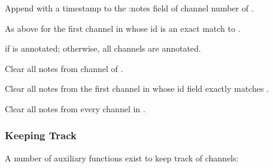 \documentclass[letterpaper,11pt,english]{sphinxmanual}
\begin{document}
\begin{fulllineitems}
\end{fulllineitems}


Append  with a timestamp to the :notes field of channel number  of .


\begin{fulllineitems}
\end{fulllineitems}


As above for the first channel in  whose id is an exact match to .


\begin{fulllineitems}
\end{fulllineitems}


if  is annotated; otherwise, all channels are annotated.

Clear all notes from channel  of .


Clear all notes from the first channel in  whose id field exactly matches .


Clear all notes from every channel in .


\subsubsection{Keeping Track}
\label{\detokenize{src/working_with_data:id1}}
A number of auxiliary functions exist to keep track of channels:

\begin{fulllineitems}
\label{\detokenize{src/working_with_data:findchan}}
\end{fulllineitems}

\end{document}
